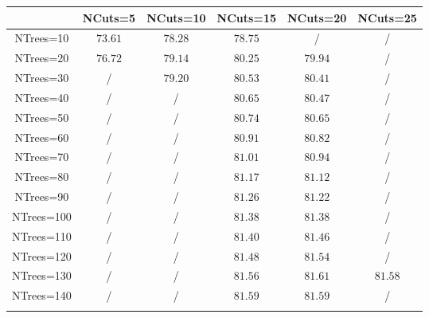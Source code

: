\centering
\begin{tabular}{cccccc} \toprule\toprule
 & NCuts=5 & NCuts=10 & NCuts=15 & NCuts=20 & NCuts=25\\\midrule
NTrees=10 & $73.61$ & $78.28$ & $78.75$ &  / &  /\\
NTrees=20 & $76.72$ & $79.14$ & $80.25$ & $79.94$ &  /\\
NTrees=30 &  / & $79.20$ & $80.53$ & $80.41$ &  /\\
NTrees=40 &  / &  / & $80.65$ & $80.47$ &  /\\
NTrees=50 &  / &  / & $80.74$ & $80.65$ &  /\\
NTrees=60 &  / &  / & $80.91$ & $80.82$ &  /\\
NTrees=70 &  / &  / & $81.01$ & $80.94$ &  /\\
NTrees=80 &  / &  / & $81.17$ & $81.12$ &  /\\
NTrees=90 &  / &  / & $81.26$ & $81.22$ &  /\\
NTrees=100 &  / &  / & $81.38$ & $81.38$ &  /\\
NTrees=110 &  / &  / & $81.40$ & $81.46$ &  /\\
NTrees=120 &  / &  / & $81.48$ & $81.54$ &  /\\
NTrees=130 &  / &  / & $81.56$ & $81.61$ & $81.58$\\
NTrees=140 &  / &  / & $81.59$ & $81.59$ &  /\\
\bottomrule\bottomrule\\
\end{tabular}
